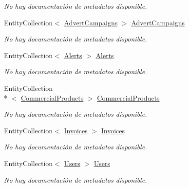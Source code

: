 \begin{DoxyCompactItemize}
\begin{DoxyCompactList}\small\item\em No hay documentación de metadatos disponible. \end{DoxyCompactList}\item 
Entity\-Collection$<$ \hyperlink{class_game_memory_1_1_advert_campaigns}{Advert\-Campaigns} $>$ \hyperlink{class_game_memory_1_1_customers_ad2341da5ce9ef77380bb9f81aace8ff5}{Advert\-Campaigns}
\begin{DoxyCompactList}\small\item\em No hay documentación de metadatos disponible. \end{DoxyCompactList}\item 
Entity\-Collection$<$ \hyperlink{class_game_memory_1_1_alerts}{Alerts} $>$ \hyperlink{class_game_memory_1_1_customers_a43d61d4c5dffe15a97d8b48da9a97a19}{Alerts}
\begin{DoxyCompactList}\small\item\em No hay documentación de metadatos disponible. \end{DoxyCompactList}\item 
Entity\-Collection\\*
$<$ \hyperlink{class_game_memory_1_1_commercial_products}{Commercial\-Products} $>$ \hyperlink{class_game_memory_1_1_customers_af6e416e7fd1236586fab8e29ba132445}{Commercial\-Products}
\begin{DoxyCompactList}\small\item\em No hay documentación de metadatos disponible. \end{DoxyCompactList}\item 
Entity\-Collection$<$ \hyperlink{class_game_memory_1_1_invoices}{Invoices} $>$ \hyperlink{class_game_memory_1_1_customers_a6348f6d374057879900c399c52a57f02}{Invoices}
\begin{DoxyCompactList}\small\item\em No hay documentación de metadatos disponible. \end{DoxyCompactList}\item 
Entity\-Collection$<$ \hyperlink{class_game_memory_1_1_users}{Users} $>$ \hyperlink{class_game_memory_1_1_customers_ab53f9e2dc522ccf676bebe8223ccbfdd}{Users}
\begin{DoxyCompactList}\small\item\em No hay documentación de metadatos disponible. \end{DoxyCompactList}\end{DoxyCompactItemize}


